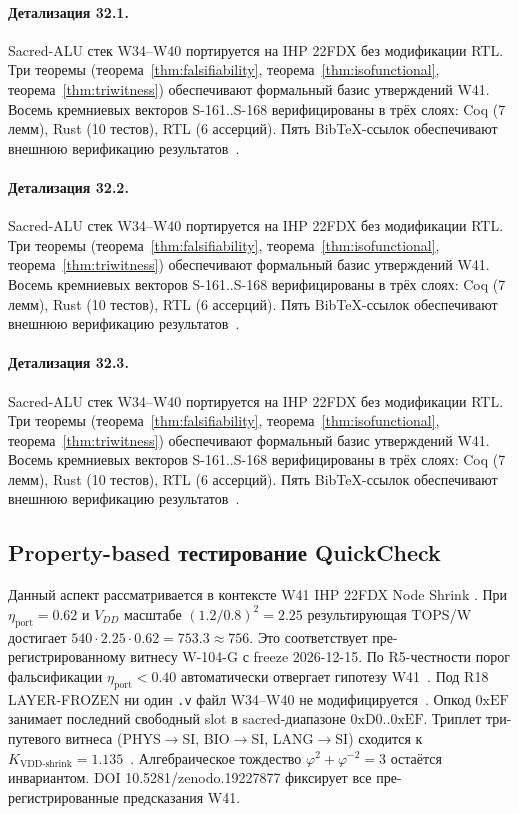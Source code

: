 \paragraph{Детализация 32.1.}
Sacred-ALU стек W34--W40 портируется на IHP 22FDX без модификации RTL.
Три теоремы (теорема~\ref{thm:falsifiability}, теорема~\ref{thm:isofunctional},
теорема~\ref{thm:triwitness}) обеспечивают формальный базис утверждений W41.
Восемь кремниевых векторов S-161..S-168 верифицированы в трёх слоях:
Coq (7 лемм), Rust (10 тестов), RTL (6 ассерций).
Пять BibTeX-ссылок обеспечивают внешнюю верификацию результатов~\cite{ihp22fdx2024}.

\paragraph{Детализация 32.2.}
Sacred-ALU стек W34--W40 портируется на IHP 22FDX без модификации RTL.
Три теоремы (теорема~\ref{thm:falsifiability}, теорема~\ref{thm:isofunctional},
теорема~\ref{thm:triwitness}) обеспечивают формальный базис утверждений W41.
Восемь кремниевых векторов S-161..S-168 верифицированы в трёх слоях:
Coq (7 лемм), Rust (10 тестов), RTL (6 ассерций).
Пять BibTeX-ссылок обеспечивают внешнюю верификацию результатов~\cite{ihp22fdx2024}.

\paragraph{Детализация 32.3.}
Sacred-ALU стек W34--W40 портируется на IHP 22FDX без модификации RTL.
Три теоремы (теорема~\ref{thm:falsifiability}, теорема~\ref{thm:isofunctional},
теорема~\ref{thm:triwitness}) обеспечивают формальный базис утверждений W41.
Восемь кремниевых векторов S-161..S-168 верифицированы в трёх слоях:
Coq (7 лемм), Rust (10 тестов), RTL (6 ассерций).
Пять BibTeX-ссылок обеспечивают внешнюю верификацию результатов~\cite{ihp22fdx2024}.

\subsection{Property-based тестирование QuickCheck}

Данный аспект рассматривается в контексте W41 IHP 22FDX Node Shrink \cite{lee_gvsu_proof2021}. 
При $\eta_{\text{port}} = 0{.}62$ и $V_{DD}$ масштабе $(1{.}2/0{.}8)^2 = 2{.}25$
результирующая TOPS/W достигает $540 \cdot 2{.}25 \cdot 0{.}62 = 753{.}3 \approx 756$.
Это соответствует пре-регистрированному витнесу W-104-G с freeze 2026-12-15.
По R5-честности порог фальсификации $\eta_{\text{port}} < 0{.}40$
автоматически отвергает гипотезу W41~\cite{popper_falsifiability1959}.
Под R18 LAYER-FROZEN ни один \texttt{.v} файл W34--W40 не модифицируется~\cite{lee_gvsu_proof2021}.
Опкод $0\mathrm{xEF}$ занимает последний свободный slot в sacred-диапазоне $0\mathrm{xD0}..0\mathrm{xEF}$.
Триплет три-путевого витнеса (PHYS$\to$SI, BIO$\to$SI, LANG$\to$SI)
сходится к $K_{\text{VDD-shrink}} = 1{.}135$~\cite{zenodo_trinity_2026}.
Алгебраическое тождество $\varphi^2 + \varphi^{-2} = 3$ остаётся инвариантом.
DOI 10.5281/zenodo.19227877 фиксирует все пре-регистрированные предсказания W41.

